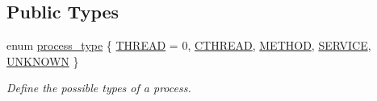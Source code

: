 \subsection*{Public Types}
\begin{DoxyCompactItemize}
\item 
enum \hyperlink{classaction__o_a72fdfe1ad9ac24109fe11bb41153b87b}{process\+\_\+type} \{ \newline
\hyperlink{classaction__o_a72fdfe1ad9ac24109fe11bb41153b87ba9bd399457c0a5bdcb111655d2fef12a5}{T\+H\+R\+E\+AD} = 0, 
\hyperlink{classaction__o_a72fdfe1ad9ac24109fe11bb41153b87ba854bd867c7b7d6c4a1cb0e8adf8c8ea1}{C\+T\+H\+R\+E\+AD}, 
\hyperlink{classaction__o_a72fdfe1ad9ac24109fe11bb41153b87baed1ba72c47b31235949577b6ce1a2980}{M\+E\+T\+H\+OD}, 
\hyperlink{classaction__o_a72fdfe1ad9ac24109fe11bb41153b87baec4636f8fb033c67560934b1af7dbed8}{S\+E\+R\+V\+I\+CE}, 
\newline
\hyperlink{classaction__o_a72fdfe1ad9ac24109fe11bb41153b87ba13f0a6af19f8554b270706ba9f27c690}{U\+N\+K\+N\+O\+WN}
 \}\begin{DoxyCompactList}\small\item\em Define the possible types of a process. \end{DoxyCompactList}
\end{DoxyCompactItemize}
